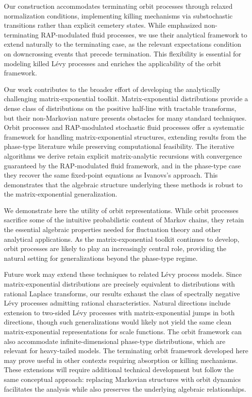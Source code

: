 \documentclass[a4paper,11pt]{article}
\numberwithin{equation}{section}
\theoremstyle{plain}
\theoremstyle{definition}
\newcommand{\1}{\mathbf{1}}
\begin{document}
Our construction accommodates terminating orbit processes through relaxed normalization conditions, implementing killing mechanisms via substochastic transitions rather than explicit cemetery states. While \cite{BeanNguyenNielsenPeralta2022} emphasized non-terminating RAP-modulated fluid processes, we use their analytical framework to extend naturally to the terminating case, as the relevant expectations condition on downcrossing events that precede termination. This flexibility is essential for modeling killed Lévy processes and enriches the applicability of the orbit framework.

Our work contributes to the broader effort of developing the analytically challenging matrix-exponential toolkit. Matrix-exponential distributions provide a dense class of distributions on the positive half-line with tractable transforms, but their non-Markovian nature presents obstacles for many standard techniques. Orbit processes and RAP-modulated stochastic fluid processes offer a systematic framework for handling matrix-exponential structures, extending results from the phase-type literature while preserving computational feasibility. The iterative algorithms we derive retain explicit matrix-analytic recursions with convergence guaranteed by the RAP-modulated fluid framework, and in the phase-type case they recover the same fixed-point equations as Ivanovs's approach. This demonstrates that the algebraic structure underlying these methods is robust to the matrix-exponential generalization.

We demonstrate here the utility of orbit representations. While orbit processes sacrifice some of the intuitive probabilistic content of Markov chains, they retain the essential algebraic properties needed for fluctuation theory and other analytical applications. As the matrix-exponential toolkit continues to develop, orbit processes are likely to play an increasingly central role, providing the natural setting for generalizations beyond the phase-type regime. 

Future work may extend these techniques to related Lévy process models. Since matrix-exponential distributions are precisely equivalent to distributions with rational Laplace transforms, our results exhaust the class of spectrally negative Lévy processes admitting rational characteristics. Natural directions include extension to two-sided Lévy processes with matrix-exponential jumps in both directions, though such generalizations would likely not yield the same clean matrix-exponential representations for scale functions. The orbit framework can also accommodate infinite-dimensional phase-type distributions, which are relevant for heavy-tailed models. The terminating orbit framework developed here may prove useful in other contexts requiring absorption or killing mechanisms. These extensions will require additional technical development but follow the same conceptual approach: replacing Markovian structures with orbit dynamics facilitates the analysis while also preserves the underlying algebraic relationships.









\end{document}
